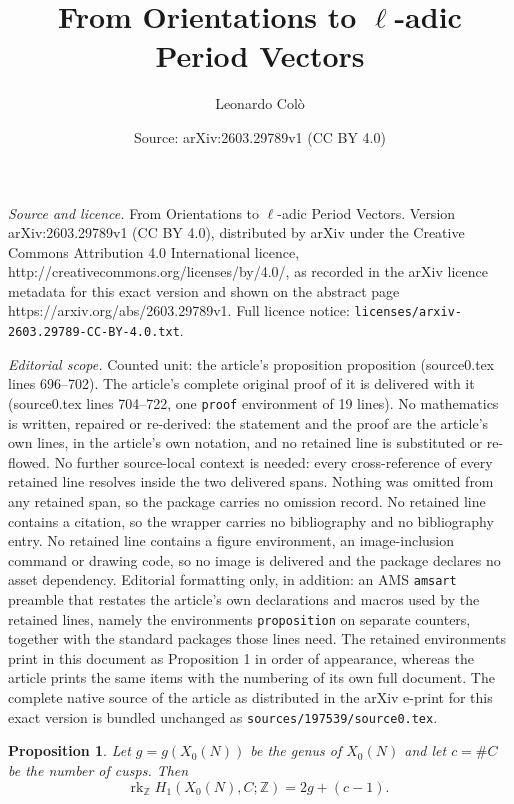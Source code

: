 \documentclass[10pt,a4paper]{amsart}
\title{From Orientations to $\ell$-adic Period Vectors}
\author{Leonardo Col\`o}
\date{Source: arXiv:2603.29789v1 (CC BY 4.0)}
\newtheorem{proposition}{Proposition}
\newcommand{\ZZ}{\mathbb{Z}}
\begin{document}
\maketitle

\noindent\emph{Source and licence.} From Orientations to $\ell$-adic Period Vectors. Version arXiv:2603.29789v1 (CC BY 4.0), distributed by arXiv under the Creative Commons Attribution 4.0 International licence, http://creativecommons.org/licenses/by/4.0/, as recorded in the arXiv licence metadata for this exact version and shown on the abstract page https://arxiv.org/abs/2603.29789v1. Full licence notice: \texttt{licenses/arxiv-2603.29789-CC-BY-4.0.txt}.\par\smallskip

\noindent\textit{Editorial scope.} Counted unit: the article's proposition proposition (source0.tex lines 696--702). The article's complete original proof of it is delivered with it (source0.tex lines 704--722, one \texttt{proof} environment of 19 lines). No mathematics is written, repaired or re-derived: the statement and the proof are the article's own lines, in the article's own notation, and no retained line is substituted or re-flowed.  No further source-local context is needed: every cross-reference of every retained line resolves inside the two delivered spans.  Nothing was omitted from any retained span, so the package carries no omission record.  No retained line contains a citation, so the wrapper carries no bibliography and no bibliography entry.  No retained line contains a figure environment, an image-inclusion command or drawing code, so no image is delivered and the package declares no asset dependency.  Editorial formatting only, in addition: an AMS \texttt{amsart} preamble that restates the article's own declarations and macros used by the retained lines, namely the environments \texttt{proposition} on separate counters, together with the standard packages those lines need.  The retained environments print in this document as Proposition 1 in order of appearance, whereas the article prints the same items with the numbering of its own full document.  The complete native source of the article as distributed in the arXiv e-print for this exact version is bundled unchanged as \texttt{sources/197539/source0.tex}.
\begin{proposition}
	Let $g=g(X_0(N))$ be the genus of $X_0(N)$ and let $c=\#C$ be the number of
	cusps. Then
	\[
	\mathrm{rk}_\ZZ\; H_1(X_0(N),C;\ZZ) = 2g + (c-1).
	\]
\end{proposition}
\end{document}
